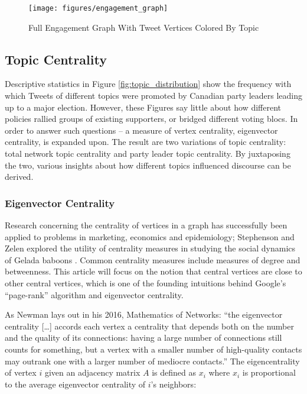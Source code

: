 \begin{figure}[h!]
  \centering
  \texttt{[image: figures/engagement\_graph]}
  \caption[Full Engagement Graph]{Full Engagement Graph With Tweet Vertices Colored By Topic}
  \label{fig:engagement_graph}
\end{figure}

\subsection{Topic Centrality}

Descriptive statistics in Figure \ref{fig:topic_distribution} show the frequency
with which Tweets of different topics were promoted by Canadian party leaders
leading up to a major election. However, these Figures say little about how
different policies rallied groups of existing supporters, or bridged different
voting blocs. In order to answer such questions -- a measure of vertex
centrality, eigenvector centrality, is expanded upon. The result are two
variations of topic centrality: total network topic centrality and party
leader topic centrality. By juxtaposing the two, various insights about how
different topics influenced discourse can be derived.

\subsubsection{Eigenvector Centrality}

Research concerning the centrality of vertices in a graph has successfully been
applied to problems in marketing, economics and epidemiology; Stephenson and
Zelen explored the utility of centrality measures in studying the social
dynamics of Gelada baboons \cite{stephenson1989rethinking}. Common centrality
measures include measures of degree and betweenness. This article will focus on
the notion that central vertices are close to other central vertices, which is
one of the founding intuitions behind Google’s “page-rank” algorithm and
eigenvector centrality.

As Newman lays out in his 2016, Mathematics of Networks: ``the eigenvector
centrality [\dots] accords each vertex a centrality that depends both on the
number and the quality of its connections: having a large number of connections
still counts for something, but a vertex with a smaller number of high-quality
contacts may outrank one with a larger number of mediocre contacts.''
\cite{newman2008mathematics} The eigencentrality of vertex $i$ given an
adjacency matrix $A$ is defined as $x_i$ where $x_i$ is proportional to the
average eigenvector centrality of $i$’s neighbors:

